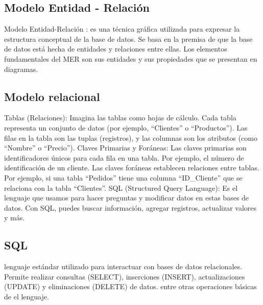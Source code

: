\documentclass{article}
\begin{document}
    \subsection{Modelo Entidad - Relación}
    
   Modelo Entidad-Relación : es una técnica gráfica utilizada para expresar la estructura conceptual de la base de datos. Se basa en la premisa de que la base de datos está hecha de entidades y relaciones entre ellas. Los elementos fundamentales del MER son sus entidades y sus propiedades que se presentan en diagramas.
   
    \subsection{Modelo relacional}
    	Tablas (Relaciones): Imagina las tablas como hojas de cálculo. Cada tabla representa un conjunto de datos (por ejemplo, “Clientes” o “Productos”). Las filas en la tabla son las tuplas (registros), y las columnas son los atributos (como “Nombre” o “Precio”).
    	Claves Primarias y Foráneas: Las claves primarias son identificadores únicos para cada fila en una tabla. Por ejemplo, el número de identificación de un cliente. Las claves foráneas establecen relaciones entre tablas. Por ejemplo, si una tabla “Pedidos” tiene una columna “ID\_Cliente” que se relaciona con la tabla “Clientes”.
    	SQL (Structured Query Language): Es el lenguaje que usamos para hacer preguntas y modificar datos en estas bases de datos. Con SQL, puedes buscar información, agregar registros, actualizar valores y más.
    	
    	\newpage
    
    \subsection{SQL}    
  
    lenguaje estándar utilizado para interactuar con bases de datos relacionales. Permite realizar consultas (SELECT), inserciones (INSERT), actualizaciones (UPDATE) y eliminaciones (DELETE) de datos. entre otras operaciones básicas de el lenguaje.
    \newpage
    
\end{document}
